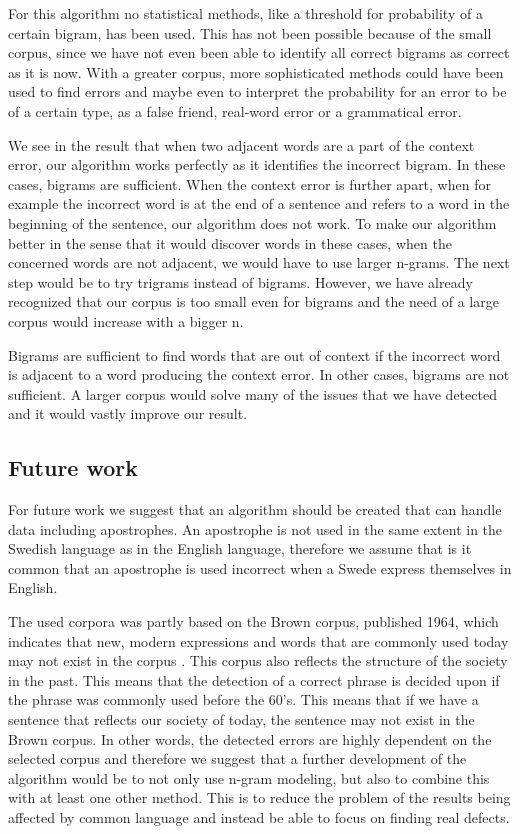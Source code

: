 \documentclass[a4paper,12pt]{article}
\begin{document}
For this algorithm no statistical methods, like a threshold for probability of a certain bigram, has been used. This has not been possible because of the small corpus, since we have not even been able to identify all correct bigrams as correct as it is now. With a greater corpus, more sophisticated methods could have been used to find errors and maybe even to interpret the probability for an error to be of a certain type, as a false friend, real-word error or a grammatical error. 

We see in the result that when two adjacent words are a part of the context error, our algorithm works perfectly as it identifies the incorrect bigram. In these cases, bigrams are sufficient. When the context error is further apart, when for example the incorrect word is at the end of a sentence and refers to a word in the beginning of the sentence, our algorithm does not work. To make our algorithm better in the sense that it would discover words in these cases, when the concerned words are not adjacent, we would have to use larger n-grams. The next step would be to try trigrams instead of bigrams. However, we have already recognized that our corpus is too small even for bigrams and the need of a large corpus would increase with a bigger n.

Bigrams are sufficient to find words that are out of context if the incorrect word is adjacent to a word producing the context error. In other cases, bigrams are not sufficient. A larger corpus would solve many of the issues that we have detected and it would vastly improve our result.  

\subsection{Future work}
\label{sec:futurework}
For future work we suggest that an algorithm should be created that can handle data including apostrophes. An apostrophe is not used in the same extent in the Swedish language as in the English language, therefore we assume that is it common that an apostrophe is used incorrect when a Swede express themselves in English. 
 
The used corpora was partly based on the Brown corpus, published 1964, which indicates that new, modern expressions and words that are commonly used today may not exist in the corpus \cite{francis64brown}. This corpus also reflects the structure of the society in the past. This means that the detection of a correct phrase is decided upon if the phrase was commonly used before the 60’s. This means that if we have a sentence that reflects our society of today, the sentence may not exist in the Brown corpus. In other words, the detected errors are highly dependent on the selected corpus and therefore we suggest that a further development of the algorithm would be to not only use n-gram modeling, but also to combine this with at least one other method. This is to reduce the problem of the results being affected by common language and instead be able to focus on finding real defects. 
\end{document}
